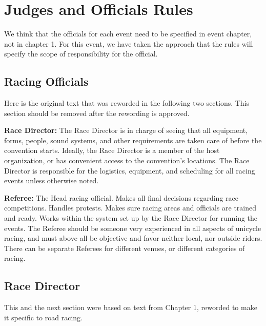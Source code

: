 \chapter{Judges and Officials Rules}

\begin{framed}
We think that the officials for each event need to be specified in event chapter, not in chapter 1. For this event, we have taken the approach that the rules will specify the scope of responsibility for the official.
\end{framed}

\section{Racing Officials}

\begin{framed}
Here is the original text that was reworded in the following two sections. This section should be removed after the rewording is approved.
\end{framed}

\textbf{Race Director:} The Race Director is in charge of seeing that all equipment, forms, people, sound systems, and other requirements are taken care of before the convention starts.
Ideally, the Race Director is a member of the host organization, or has convenient access to the convention's locations.
The Race Director is responsible for the logistics, equipment, and scheduling for all racing events unless otherwise noted.

\textbf{Referee:} The Head racing official.
Makes all final decisions regarding race competitions.
Handles protests.
Makes sure racing areas and officials are trained and ready.
Works within the system set up by the Race Director for running the events.
The Referee should be someone very experienced in all aspects of unicycle racing, and must above all be objective and favor neither local, nor outside riders.
There can be separate Referees for different venues, or different categories of racing.

\section{Race Director}

\begin{framed}
This and the next section were based on text from Chapter 1, reworded to make it specific to road racing.
\end{framed}

